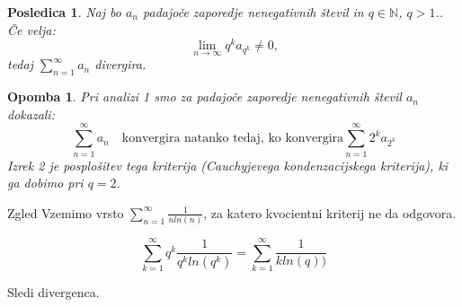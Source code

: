 \documentclass{beamer}
\newtheorem{posledica}{Posledica}
\newtheorem{opomba}{Opomba}
\begin{document}
\begin{frame}
    \begin{posledica}
        Naj bo $a_n$ padajoče zaporedje nenegativnih števil in $ q \in {\mathbb{N}}$, $q > 1$.. Če velja:
        \[
            \lim_{n \to \infty}{q^ka_{q^k}} \neq 0 \text{,} 
        \]
        tedaj $\sum_{n = 1}^{\infty}{a_n}$ divergira.
    \end{posledica}
    
\end{frame}

\begin{frame}
    \begin{opomba}
        Pri analizi 1 smo za padajoče zaporedje nenegativnih števil ${a_n}$ dokazali:
        \[
            \sum_{n = 1}^{\infty}{a_n} \quad \text{konvergira natanko tedaj, ko konvergira}
            \sum_{n = 1}^{\infty}{2^ka_{2^k}}
        \]
        Izrek 2 je posplošitev tega kriterija (Cauchyjevega kondenzacijskega kriterija), ki ga dobimo pri $q = 2$.
    \end{opomba}
\end{frame}

\begin{frame}{Zgled}
    Vzemimo vrsto $\sum_{n = 1}^{\infty}{\frac{1}{nln(n)}}$, za katero kvocientni kriterij ne da odgovora.
    \pause

    \vspace{0.3cm}
    \[
        \sum_{k = 1}^{\infty}{q^k\frac{1}{q^kln(q^k)}} =
        \sum_{k = 1}^{\infty}{\frac{1}{kln(q))}}
    \]

    Sledi divergenca.
    
\end{frame}
\end{document}
